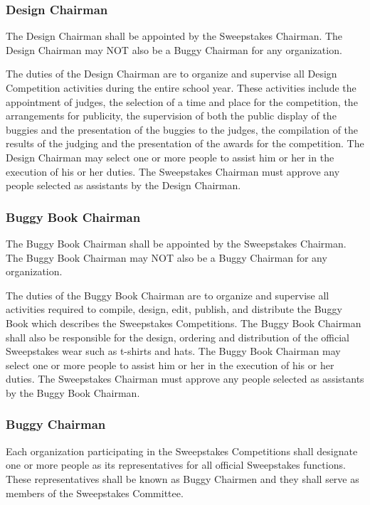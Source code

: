 \subsubsection{Design Chairman}

	The Design Chairman shall be appointed by the Sweepstakes Chairman. The Design Chairman may NOT also be a Buggy Chairman for any organization.

	The duties of the Design Chairman are to organize and supervise all Design Competition activities during the entire school year. These activities include the appointment of judges, the selection of a time and place for the competition, the arrangements for publicity, the supervision of both the public display of the buggies and the presentation of the buggies to the judges, the compilation of the results of the judging and the presentation of the awards for the competition. The Design Chairman may select one or more people to assist him or her in the execution of his or her duties. The Sweepstakes Chairman must approve any people selected as assistants by the Design Chairman.

\subsubsection{Buggy Book Chairman}

	The Buggy Book Chairman shall be appointed by the Sweepstakes Chairman. The Buggy Book Chairman may NOT also be a Buggy Chairman for any organization.

	The duties of the Buggy Book Chairman are to organize and supervise all activities required to compile, design, edit, publish, and distribute the Buggy Book which describes the Sweepstakes Competitions. The Buggy Book Chairman shall also be responsible for the design, ordering and distribution of the official Sweepstakes wear such as t-shirts and hats. The Buggy Book Chairman may select one or more people to assist him or her in the execution of his or her duties. The Sweepstakes Chairman must approve any people selected as assistants by the Buggy Book Chairman.

\subsubsection{Buggy Chairman}

	Each organization participating in the Sweepstakes Competitions shall designate one or more people as its representatives for all official Sweepstakes functions. These representatives shall be known as Buggy Chairmen and they shall serve as members of the Sweepstakes Committee.

